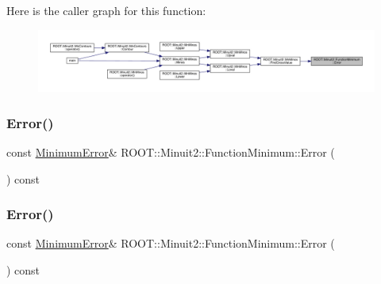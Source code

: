Here is the caller graph for this function\+:
\nopagebreak
\begin{figure}[H]
\begin{center}
\leavevmode
\includegraphics[width=350pt]{d4/dfb/classROOT_1_1Minuit2_1_1FunctionMinimum_a24f73efe7b4ed139bcf28e62ab01b347_icgraph}
\end{center}
\end{figure}
\mbox{\label{classROOT_1_1Minuit2_1_1FunctionMinimum_a24f73efe7b4ed139bcf28e62ab01b347}} 
\subsubsection{\texorpdfstring{Error()}{Error()}\hspace{0.1cm}{\footnotesize\ttfamily [2/3]}}
{\footnotesize\ttfamily const \mbox{\hyperlink{classROOT_1_1Minuit2_1_1MinimumError}{Minimum\+Error}}\& R\+O\+O\+T\+::\+Minuit2\+::\+Function\+Minimum\+::\+Error (\begin{DoxyParamCaption}{ }\end{DoxyParamCaption}) const\hspace{0.3cm}{\ttfamily [inline]}}

\mbox{\label{classROOT_1_1Minuit2_1_1FunctionMinimum_a24f73efe7b4ed139bcf28e62ab01b347}} 
\subsubsection{\texorpdfstring{Error()}{Error()}\hspace{0.1cm}{\footnotesize\ttfamily [3/3]}}
{\footnotesize\ttfamily const \mbox{\hyperlink{classROOT_1_1Minuit2_1_1MinimumError}{Minimum\+Error}}\& R\+O\+O\+T\+::\+Minuit2\+::\+Function\+Minimum\+::\+Error (\begin{DoxyParamCaption}{ }\end{DoxyParamCaption}) const\hspace{0.3cm}{\ttfamily [inline]}}

